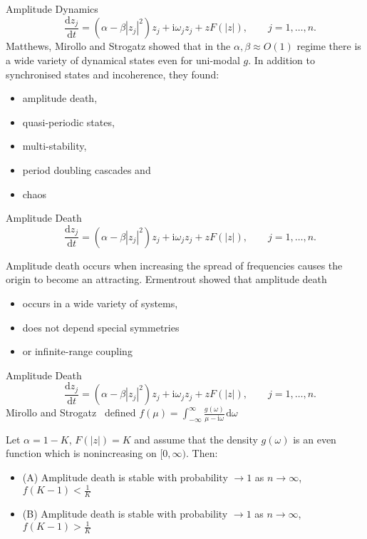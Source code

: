 \documentclass[10pt,reqno]{beamer}
\newcommand{\D}[2]{\frac{\mathrm{d} #1}{\mathrm{d} #2}}
\newcommand{\I}{\mathrm{i}}
\newcommand{\df}[1]{\mspace{2mu}  \mathrm{d}#1}
\begin{document}
\begin{frame}{Amplitude Dynamics}
\[
\quad \D{z_j}{t} = (\alpha - \beta|z_j|^2)z_j + \I\omega_jz_j +zF(|z|), \qquad j = 1,\ldots, n.
\]
Matthews, Mirollo and Strogatz\cite{Matthews91} showed that in the $\alpha, \beta \approx O(1)$ regime there is a wide variety of dynamical states even for uni-modal $g$.
In addition to synchronised states and incoherence, they found:
\begin{itemize}
	\item amplitude death,
	\item quasi-periodic states,
	\item multi-stability,
	\item period doubling cascades and
	\item chaos
\end{itemize}
\end{frame}
\begin{frame}{Amplitude Death}
\[
\quad \D{z_j}{t} = (\alpha - \beta|z_j|^2)z_j + \I\omega_jz_j +zF(|z|), \qquad j = 1,\ldots, n.
\]

Amplitude death occurs when increasing the spread of frequencies causes the origin to become an attracting.
\vfill
Ermentrout\cite{Ermentrout90} showed that amplitude death 
\begin{itemize}
\item occurs in a wide variety of systems, 
\item does not depend special symmetries 
\item or infinite-range coupling
\end{itemize}
\end{frame}
\begin{frame}{Amplitude Death}
\[
\quad \D{z_j}{t} = (\alpha - \beta|z_j|^2)z_j + \I\omega_jz_j +zF(|z|), \qquad j = 1,\ldots, n.
\]
Mirollo and Strogatz~\cite{Mirollo90} defined
$f(\mu) = \int_{-\infty}^\infty \frac{g(\omega)}{\mu - \I\omega}\df{\omega}$
\begin{tcolorbox}[notitle, boxrule=0pt, colback=lred]
\begin{theorem}
Let $\alpha = 1-K$, $F(|z|)=K$ and assume that the density $g(\omega)$ is an even function which is nonincreasing on $[0,\infty)$.
Then: 
\begin{itemize}
	\item (A) Amplitude death is stable with 
	probability $\rightarrow 1$ as $n \rightarrow \infty$, $f(K-1) < \frac{1}{K}$
\item (B) Amplitude death is stable with 
probability $\rightarrow 1$ as $n \rightarrow \infty$, $f(K-1) > \frac{1}{K}$
\end{itemize}
\end{theorem}
\end{tcolorbox}
\end{frame}
\end{document}
